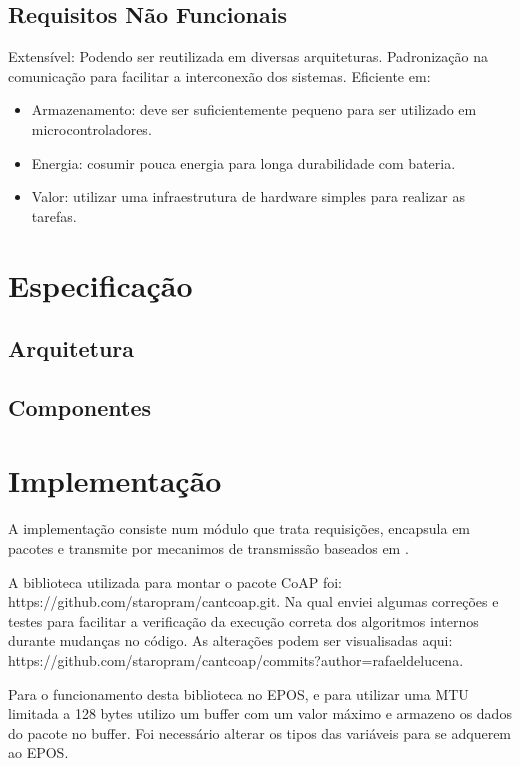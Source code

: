\subsection{Requisitos N\~ao Funcionais}

Extens\'ivel: Podendo ser reutilizada em diversas arquiteturas.
Padroniza\c{c}\~ao na comunica\c{c}\~ao para facilitar a interconex\~ao dos sistemas.
Eficiente em:
    \begin{itemize}
        \item Armazenamento: deve ser suficientemente pequeno para ser utilizado em microcontroladores.
        \item Energia: cosumir pouca energia para longa durabilidade com bateria.
        \item Valor: utilizar uma infraestrutura de hardware simples para realizar as tarefas.
    \end{itemize}

\section{Especifica\c{c}\~ao}
\subsection{Arquitetura}
\subsection{Componentes}


\section{Implementa\c{c}\~ao}

A implementa\c{c}\~ao consiste num m\'odulo que trata requisi\c{c}\~oes, encapsula em pacotes e transmite por mecanimos de transmiss\~ao baseados em \cite{draft-ietf-core-coap-18}.

A biblioteca utilizada para montar o pacote CoAP foi:\\https://github.com/staropram/cantcoap.git. Na qual enviei algumas corre\c{c}\~oes e testes para facilitar a verifica\c{c}\~ao da execu\c{c}\~ao correta dos algoritmos internos durante mudan\c{c}as no c\'odigo. As altera\c{c}\~oes podem ser visualisadas aqui:\\https://github.com/staropram/cantcoap/commits?author=rafaeldelucena.

Para o funcionamento desta biblioteca no EPOS, e para utilizar uma MTU limitada a 128 bytes utilizo um buffer com um valor m\'aximo e armazeno os dados do pacote no buffer. Foi necess\'ario alterar os tipos das vari\'aveis para se adquerem ao EPOS.

